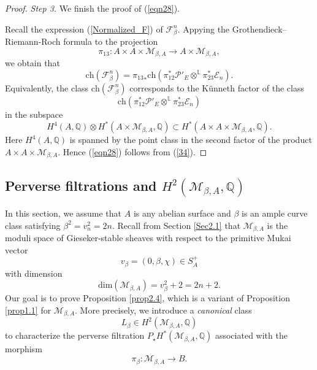 \documentclass[11pt]{amsart}
\theoremstyle{plain}
\theoremstyle{definition}
\theoremstyle{remark}
\newcommand{\BL}{{\mathbb{L}}}
\newcommand{\BQ}{{\mathbb{Q}}}
\newcommand{\CE}{{\mathcal E}}
\newcommand{\CF}{{\mathcal F}}
\newcommand{\CM}{{\mathcal M}}
\newcommand{\CP}{{\mathcal P}}
\begin{document}
\begin{proof}
\noindent \emph{Step 3.} We finish the proof of (\ref{eqn28}). 

Recall the expression (\ref{Normalized_F}) of $\CF^n_\beta$. Appying the Grothendieck--Riemann-Roch formula to the projection
\[
\pi_{13}: A \times A \times \CM_{\beta, A} \to A \times \CM_{\beta,A},
\]
we obtain that
\[
\mathrm{ch}(\CF^n_\beta) = {\pi_{13}}_\ast \mathrm{ch}(\pi_{12}^\ast {\CP'_{E}} \otimes^{\BL} \pi_{23}^\ast \CE_n).
\]
Equivalently, the class $\mathrm{ch}(\CF^n_\beta)$ corresponds to the K\"unneth factor of the class
\[
\mathrm{ch}(\pi_{12}^\ast {\CP'_{E}} \otimes^{\BL} \pi_{23}^\ast \CE_n) 
\]
in the subspace
\[
H^4(A, \BQ) \otimes H^*(A \times \CM_{\beta,A}, \BQ) \subset H^*(A\times A \times \CM_{\beta, A}, \BQ).
\]
Here $H^4(A, \BQ)$ is spanned by the point class in the second factor of the product $A \times A \times \CM_{\beta, A}$. Hence (\ref{eqn28}) follows from (\ref{34}).
\end{proof}


\subsection{Perverse filtrations and $H^2(\CM_{\beta,A}, \BQ)$}
In this section, we assume that $A$ is any abelian surface and $\beta$ is an ample curve class satisfying {$\beta^2= v_n^2=2n$}. Recall from Section \ref{Sec2.1} that $\CM_{\beta,A}$ is the moduli space of Gieseker-stable sheaves with respect to the primitive Mukai vector
\begin{equation}\label{vbeta}
v_\beta = (0, \beta, \chi) \in S_A^+
\end{equation}
with dimension
\[
\mathrm{dim}(\CM_{\beta,A}) = v_\beta^2+2 = 2n+2.
\]
Our goal is to prove Proposition \ref{prop2.4}, which is a variant of Proposition \ref{prop1.1} for $\CM_{\beta,A}$.  More precisely, we introduce a \emph{canonical} class
 \begin{equation}\label{ample_base}
 L_\beta \in H^2(\CM_{\beta,A} ,\BQ)
 \end{equation}
to characterize the perverse filtration $P_{\star} H^*(\CM_{\beta, A}, \BQ)$ associated with the morphism
\[
\pi_\beta: \CM_{\beta, A} \to B. 
\]
\end{document}
